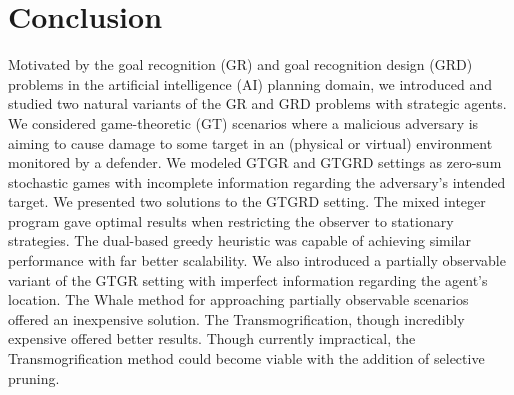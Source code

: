 %
%
\chapter{Conclusion}

\nocite{Dijkstra80}
\nocite{plop03-paper}
Motivated by the goal recognition (GR) 
and goal recognition design (GRD) problems 
in the artificial intelligence (AI) planning domain, 
we introduced and studied two natural variants of the 
GR and GRD problems with strategic agents. We considered game-theoretic (GT)
scenarios where a malicious adversary 
is aiming to cause damage to some target in an
(physical or virtual) environment monitored by a defender. We modeled GTGR and GTGRD settings as zero-sum stochastic games
with incomplete information regarding the adversary's intended target. We presented two solutions to the GTGRD setting. The mixed integer program gave optimal results when restricting the observer to stationary strategies. The dual-based greedy heuristic was capable of achieving similar performance with far better scalability. We also introduced a partially observable variant of the GTGR setting with imperfect information regarding the agent's location. The Whale method for approaching partially observable scenarios offered an inexpensive solution. The Transmogrification, though incredibly expensive offered better results. Though currently impractical, the Transmogrification method could become viable with the addition of selective pruning. 